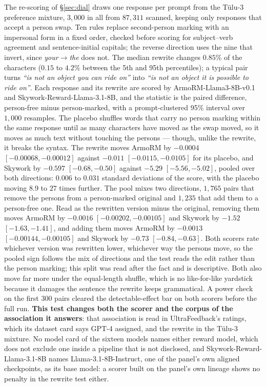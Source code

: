 The re-scoring of \S\ref{sec:dial} draws one response per prompt from the T\"ulu-3 preference mixture, $3{,}000$ in all from $87{,}311$ scanned, keeping only responses that accept a person swap. Ten rules replace second-person marking with an impersonal form in a fixed order, checked before scoring for subject--verb agreement and sentence-initial capitals; the reverse direction uses the nine that invert, since \emph{your}$\rightarrow$\emph{the} does not. The median rewrite changes $0.85\%$ of the characters ($0.15$ to $4.2\%$ between the 5th and 95th percentiles); a typical pair turns \emph{``is not an object you can ride on''} into \emph{``is not an object it is possible to ride on''}. Each response and its rewrite are scored by ArmoRM-Llama3-8B-v0.1 and Skywork-Reward-Llama-3.1-8B, and the statistic is the paired difference, person-free minus person-marked, with a prompt-clustered 95\% interval over $1{,}000$ resamples. The placebo shuffles words that carry no person marking within the same response until as many characters have moved as the swap moved, so it moves as much text without touching the persons --- though, unlike the rewrite, it breaks the syntax. The rewrite moves ArmoRM by $-0.0004$ $[-0.00068,-0.00012]$ against $-0.011$ $[-0.0115,-0.0105]$ for its placebo, and Skywork by $-0.597$ $[-0.68,-0.50]$ against $-5.29$ $[-5.56,-5.02]$, pooled over both directions: $0.006$ to $0.031$ standard deviations of the score, with the placebo moving $8.9$ to $27$ times further. The pool mixes two directions, $1{,}765$ pairs that remove the persons from a person-marked original and $1{,}235$ that add them to a person-free one. Read as the rewritten version minus the original, removing them moves ArmoRM by $-0.0016$ $[-0.00202,-0.00105]$ and Skywork by $-1.52$ $[-1.63,-1.41]$, and adding them moves ArmoRM by $-0.0013$ $[-0.00144,-0.00105]$ and Skywork by $-0.73$ $[-0.84,-0.63]$. Both scorers rate whichever version was rewritten lower, whichever way the persons move, so the pooled sign follows the mix of directions and the test reads the edit rather than the person marking; this split was read after the fact and is descriptive. Both also move far more under the equal-length shuffle, which is no like-for-like yardstick because it damages the sentence the rewrite keeps grammatical. A power check on the first $300$ pairs cleared the detectable-effect bar on both scorers before the full run. \textbf{This test changes both the scorer and the corpus of the association it answers}: that association is read in UltraFeedback's ratings, which its dataset card says GPT-4 assigned, and the rewrite in the T\"ulu-3 mixture. No model card of the sixteen models names either reward model, which does not exclude one inside a pipeline that is not disclosed, and Skywork-Reward-Llama-3.1-8B names Llama-3.1-8B-Instruct, one of the panel's own aligned checkpoints, as its base model: a scorer built on the panel's own lineage shows no penalty in the rewrite test either.
